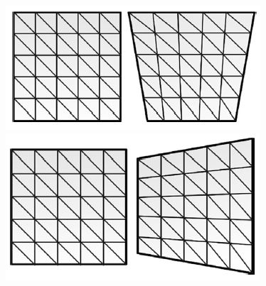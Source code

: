 \documentclass[12pt]{article}
\begin{document}
\begin{figure}[H]
	\begin{center}
		\includegraphics[scale=0.8]{U121_Eta_121.JPG}  \qquad \qquad
		\includegraphics[scale=0.8]{U212_Eta_212.JPG}
	\end{center}  
\end{figure}
\end{document}
